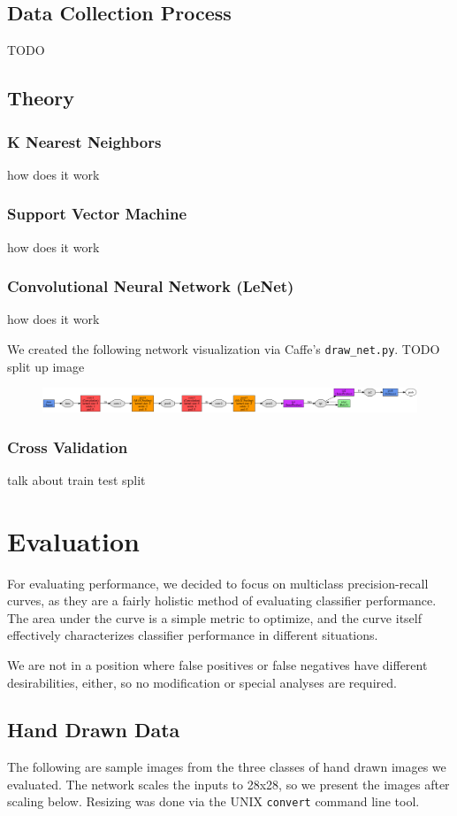 \documentclass[leqno]{article}
\begin{document}
\subsection{Data Collection Process}
TODO

\subsection{Theory}
\subsubsection{K Nearest Neighbors}
how does it work
\subsubsection{Support Vector Machine}
how does it work
\subsubsection{Convolutional Neural Network (LeNet)}
how does it work

We created the following network visualization via Caffe's
\texttt{draw\_net.py}.
 TODO split up image
\begin{figure}[h!]
  \centering
  \includegraphics[width=\textwidth]{lenet.png}
\end{figure}
\subsubsection{Cross Validation}
talk about train test split
\section{Evaluation}
For evaluating performance, we decided to focus on multiclass precision-recall
curves, as they are a fairly holistic method of evaluating classifier
performance. The area under the curve is a simple metric to optimize, and the
curve itself effectively characterizes classifier performance in different
situations.

We are not in a position where false positives or false negatives
have different desirabilities, either, so no modification or special analyses
are required.

\subsection{Hand Drawn Data}
The following are sample images from the three classes of hand drawn images we evaluated. The network
scales the inputs to 28x28, so we present the images after scaling below. Resizing was done via the UNIX \texttt{convert} command line tool.
\end{document}

